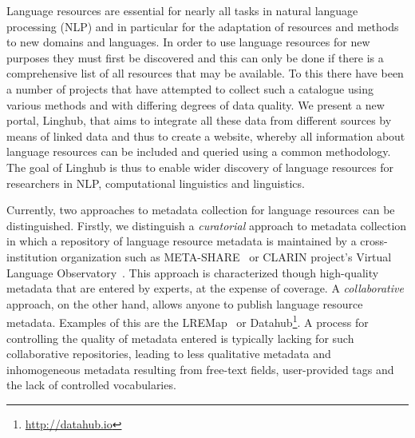 \documentclass{acm_proc_article-sp}
\begin{document}
Language resources are essential for nearly all tasks in natural language
processing (NLP) and in particular
for the adaptation of resources and methods to new domains and languages. In
order to use language resources for new purposes they must first be discovered
and this can only be done if there is a comprehensive list of all resources that
may be available. To this there have been a number of projects that have
attempted to collect such a catalogue using various methods and with differing
degrees of data quality. We present a new portal, Linghub, that aims to integrate all
these data from different sources by means of linked data and thus to create a
website, whereby all information about language resources can be included and
queried using a common methodology. The goal of Linghub is thus to enable wider
discovery of language resources for researchers in NLP, computational
linguistics and linguistics.

Currently, two approaches to metadata collection for language resources can be
distinguished. Firstly, we distinguish a \emph{curatorial} approach to metadata
collection in which a repository of language resource metadata is maintained by
a cross-institution organization such as META-SHARE~\cite{federmann2012meta} or
CLARIN project's Virtual Language Observatory~\cite[VLO]{van2012semantic}. This
approach is characterized though high-quality metadata that are entered by
experts, at the expense of coverage. A \emph{collaborative} approach, on the other
hand, allows anyone to publish language resource metadata. Examples of this are
the LREMap~\cite{calzolari2012lre} or Datahub\footnote{\url{http://datahub.io}}. A process for controlling the quality of metadata entered
is typically lacking for such collaborative repositories, leading to less
qualitative metadata and inhomogeneous metadata resulting from free-text fields,
user-provided tags and the lack of controlled vocabularies.
\end{document}

